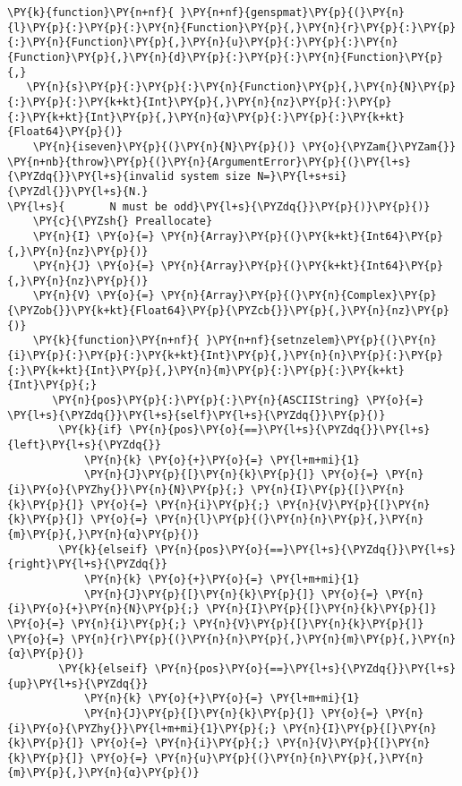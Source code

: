 \begin{Verbatim}[commandchars=\\\{\}]
\PY{k}{function}\PY{n+nf}{ }\PY{n+nf}{genspmat}\PY{p}{(}\PY{n}{l}\PY{p}{:}\PY{p}{:}\PY{n}{Function}\PY{p}{,}\PY{n}{r}\PY{p}{:}\PY{p}{:}\PY{n}{Function}\PY{p}{,}\PY{n}{u}\PY{p}{:}\PY{p}{:}\PY{n}{Function}\PY{p}{,}\PY{n}{d}\PY{p}{:}\PY{p}{:}\PY{n}{Function}\PY{p}{,}
   \PY{n}{s}\PY{p}{:}\PY{p}{:}\PY{n}{Function}\PY{p}{,}\PY{n}{N}\PY{p}{:}\PY{p}{:}\PY{k+kt}{Int}\PY{p}{,}\PY{n}{nz}\PY{p}{:}\PY{p}{:}\PY{k+kt}{Int}\PY{p}{,}\PY{n}{α}\PY{p}{:}\PY{p}{:}\PY{k+kt}{Float64}\PY{p}{)}
    \PY{n}{iseven}\PY{p}{(}\PY{n}{N}\PY{p}{)} \PY{o}{\PYZam{}\PYZam{}} \PY{n+nb}{throw}\PY{p}{(}\PY{n}{ArgumentError}\PY{p}{(}\PY{l+s}{\PYZdq{}}\PY{l+s}{invalid system size N=}\PY{l+s+si}{\PYZdl{}}\PY{l+s}{N.}
\PY{l+s}{       N must be odd}\PY{l+s}{\PYZdq{}}\PY{p}{)}\PY{p}{)}
    \PY{c}{\PYZsh{} Preallocate}
    \PY{n}{I} \PY{o}{=} \PY{n}{Array}\PY{p}{(}\PY{k+kt}{Int64}\PY{p}{,}\PY{n}{nz}\PY{p}{)}
    \PY{n}{J} \PY{o}{=} \PY{n}{Array}\PY{p}{(}\PY{k+kt}{Int64}\PY{p}{,}\PY{n}{nz}\PY{p}{)}
    \PY{n}{V} \PY{o}{=} \PY{n}{Array}\PY{p}{(}\PY{n}{Complex}\PY{p}{\PYZob{}}\PY{k+kt}{Float64}\PY{p}{\PYZcb{}}\PY{p}{,}\PY{n}{nz}\PY{p}{)}
    \PY{k}{function}\PY{n+nf}{ }\PY{n+nf}{setnzelem}\PY{p}{(}\PY{n}{i}\PY{p}{:}\PY{p}{:}\PY{k+kt}{Int}\PY{p}{,}\PY{n}{n}\PY{p}{:}\PY{p}{:}\PY{k+kt}{Int}\PY{p}{,}\PY{n}{m}\PY{p}{:}\PY{p}{:}\PY{k+kt}{Int}\PY{p}{;}
       \PY{n}{pos}\PY{p}{:}\PY{p}{:}\PY{n}{ASCIIString} \PY{o}{=} \PY{l+s}{\PYZdq{}}\PY{l+s}{self}\PY{l+s}{\PYZdq{}}\PY{p}{)}
        \PY{k}{if} \PY{n}{pos}\PY{o}{==}\PY{l+s}{\PYZdq{}}\PY{l+s}{left}\PY{l+s}{\PYZdq{}}
            \PY{n}{k} \PY{o}{+}\PY{o}{=} \PY{l+m+mi}{1}
            \PY{n}{J}\PY{p}{[}\PY{n}{k}\PY{p}{]} \PY{o}{=} \PY{n}{i}\PY{o}{\PYZhy{}}\PY{n}{N}\PY{p}{;} \PY{n}{I}\PY{p}{[}\PY{n}{k}\PY{p}{]} \PY{o}{=} \PY{n}{i}\PY{p}{;} \PY{n}{V}\PY{p}{[}\PY{n}{k}\PY{p}{]} \PY{o}{=} \PY{n}{l}\PY{p}{(}\PY{n}{n}\PY{p}{,}\PY{n}{m}\PY{p}{,}\PY{n}{α}\PY{p}{)}
        \PY{k}{elseif} \PY{n}{pos}\PY{o}{==}\PY{l+s}{\PYZdq{}}\PY{l+s}{right}\PY{l+s}{\PYZdq{}}
            \PY{n}{k} \PY{o}{+}\PY{o}{=} \PY{l+m+mi}{1}
            \PY{n}{J}\PY{p}{[}\PY{n}{k}\PY{p}{]} \PY{o}{=} \PY{n}{i}\PY{o}{+}\PY{n}{N}\PY{p}{;} \PY{n}{I}\PY{p}{[}\PY{n}{k}\PY{p}{]} \PY{o}{=} \PY{n}{i}\PY{p}{;} \PY{n}{V}\PY{p}{[}\PY{n}{k}\PY{p}{]} \PY{o}{=} \PY{n}{r}\PY{p}{(}\PY{n}{n}\PY{p}{,}\PY{n}{m}\PY{p}{,}\PY{n}{α}\PY{p}{)}
        \PY{k}{elseif} \PY{n}{pos}\PY{o}{==}\PY{l+s}{\PYZdq{}}\PY{l+s}{up}\PY{l+s}{\PYZdq{}}
            \PY{n}{k} \PY{o}{+}\PY{o}{=} \PY{l+m+mi}{1}
            \PY{n}{J}\PY{p}{[}\PY{n}{k}\PY{p}{]} \PY{o}{=} \PY{n}{i}\PY{o}{\PYZhy{}}\PY{l+m+mi}{1}\PY{p}{;} \PY{n}{I}\PY{p}{[}\PY{n}{k}\PY{p}{]} \PY{o}{=} \PY{n}{i}\PY{p}{;} \PY{n}{V}\PY{p}{[}\PY{n}{k}\PY{p}{]} \PY{o}{=} \PY{n}{u}\PY{p}{(}\PY{n}{n}\PY{p}{,}\PY{n}{m}\PY{p}{,}\PY{n}{α}\PY{p}{)}

\end{Verbatim}
